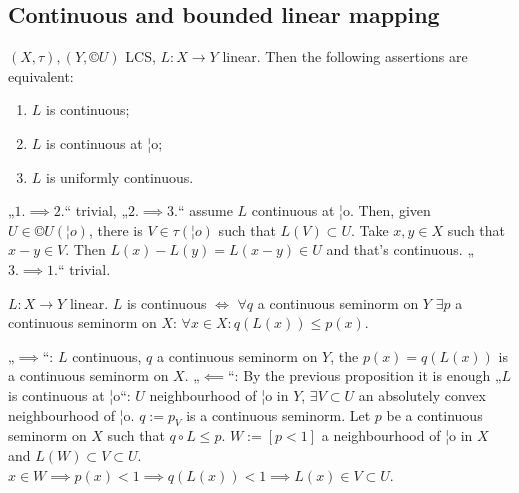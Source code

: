 \documentclass[12pt]{article}					%
\begin{document}
\subsection{Continuous and bounded linear mapping}
\begin{tvrzeni}
	$(X, τ), (Y, ©U)$ LCS, $L: X \rightarrow Y$ linear. Then the following assertions are equivalent:
	\begin{enumerate}
		\item $L$ is continuous;
		\item $L$ is continuous at ¦o;
		\item $L$ is uniformly continuous.
	\end{enumerate}

	\begin{dukazin}
		„$1. \implies 2.$“ trivial, „$2. \implies 3.$“ assume $L$ continuous at ¦o. Then, given $U \in ©U(¦o)$, there is $V \in τ(¦o)$ such that $L(V) \subset U$. Take $x, y \in X$ such that $x - y \in V$. Then $L(x) - L(y) = L(x - y) \in U$ and that's continuous. „$3. \implies 1.$“ trivial.
	\end{dukazin}
\end{tvrzeni}

\begin{tvrzeni}
	$L: X \rightarrow Y$ linear. $L$ is continuous $\Leftrightarrow$ $\forall q$ a continuous seminorm on $Y$ $\exists p$ a continuous seminorm on $X$: $\forall x \in X: q(L(x)) ≤ p(x)$.

	\begin{dukazin}
		„$\implies$“: $L$ continuous, $q$ a continuous seminorm on $Y$, the $p(x) = q(L(x))$ is a continuous seminorm on $X$. „$\impliedby$“: By the previous proposition it is enough „$L$ is continuous at ¦o“: $U$ neighbourhood of ¦o in $Y$, $\exists V \subset U$ an absolutely convex neighbourhood of ¦o. $q:=p_V$ is a continuous seminorm. Let $p$ be a continuous seminorm on $X$ such that $q ∘ L ≤ p$. $W := [p < 1]$ a neighbourhood of ¦o in $X$ and $L(W) \subset V \subset U$. $x \in W \implies p(x) < 1 \implies q(L(x)) < 1 \implies L(x) \in V \subset U$.
	\end{dukazin}
\end{tvrzeni}

\end{document}

